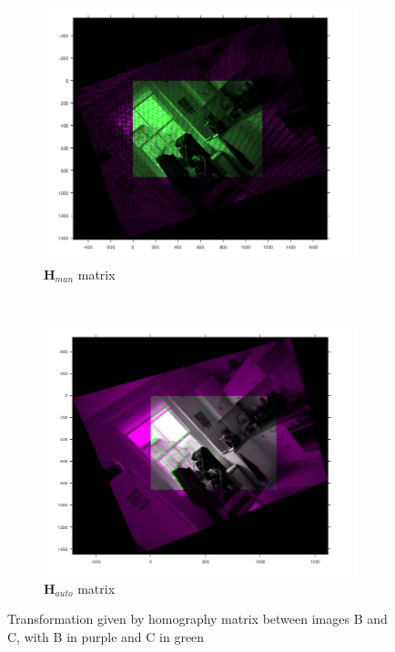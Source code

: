 \documentclass[a4paper, 10pt, conference]{ieeeconf}
\begin{document}
\begin{figure}[!ht]
  \captionsetup[subfigure]{position=b}
  \centering
    \begin{subfigure}{0.45\linewidth}
      \includegraphics[width=\textwidth]{pic/q2_1_b1_BC_pair}
      \caption{$\textbf{H}_{man}$ matrix}
      \label{fig:manHomog}
    \end{subfigure}
    ~
    \begin{subfigure}{0.45\linewidth}
      \includegraphics[width=\textwidth]{pic/q2_1_b2_BC_pair}
      \caption{$\textbf{H}_{auto}$ matrix}
      \label{fig:autoHomog}
    \end{subfigure}

	\caption{Transformation given by homography matrix between images B and C, with B in purple and C in green}
  \label{fig:matchBC}
\end{figure}
\end{document}
